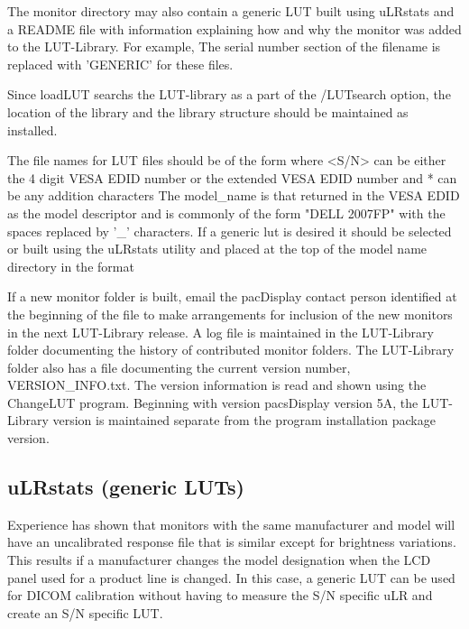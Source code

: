 The monitor directory may also contain a generic LUT built using uLRstats and a README file with information explaining how and why the monitor was added to the LUT-Library. For example,
The serial number section of the filename is replaced with 'GENERIC' for these files. 

Since loadLUT searchs the LUT-library as a part of the /LUTsearch option, the location of the library and the library structure should be maintained as installed. 

The file names for LUT files should be of the form
where <S/N> can be either the 4 digit VESA EDID number or the extended VESA EDID number and * can be any addition characters The model\_name is that returned in the VESA EDID as the model descriptor and is commonly of the form "DELL 2007FP" with the spaces replaced by '\_' characters. If a generic lut is desired it should be selected or built using the uLRstats utility and placed at the top of the model name directory in the format 

If a new monitor folder is built, email the pacDisplay contact person identified at the beginning of the file to make arrangements for inclusion of the new monitors in the next LUT-Library release. A log file is maintained in the LUT-Library folder documenting the history of contributed monitor folders. The LUT-Library folder also has a file documenting the current version number, VERSION\_INFO.txt. The version information is read and shown using the ChangeLUT program. Beginning with version pacsDisplay version 5A, the LUT-Library version is maintained separate from the program installation package version. 

\subsection{uLRstats (generic LUTs)}
\label{sec:genericluts}

Experience has shown that monitors with the same manufacturer and model will have an uncalibrated response file that is similar except for brightness variations. This results if a manufacturer changes the model designation when the LCD panel used for a product line is changed. In this case, a generic LUT can be used for DICOM calibration without having to measure the S/N specific uLR and create an S/N specific LUT. 

